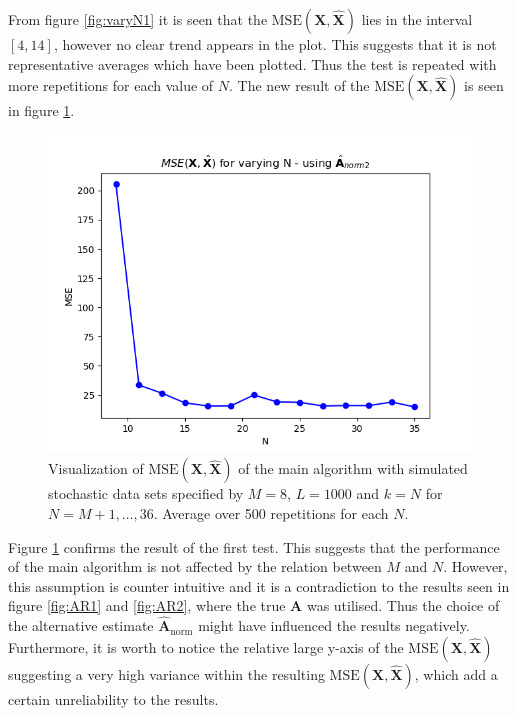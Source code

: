 \noindent
From figure \ref{fig:varyN1} it is seen that the $\text{MSE}(\mathbf{X}, \hat{\mathbf{X}})$ lies in the interval $[4,14]$, however no clear trend appears in the plot. 
This suggests that it is not representative averages which have been plotted. Thus the test is repeated with more repetitions for each value of $N$. The new result of the $\text{MSE}(\mathbf{X}, \hat{\mathbf{X}})$ is seen in figure \ref{fig:varyN2}.
\begin{figure}[H]
    \centering
	\includegraphics[scale=0.5]{figures/ch_6/varyN2.png}
	\caption{Visualization of $\text{MSE}(\mathbf{X}, \hat{\mathbf{X}})$ of the main algorithm with simulated stochastic data sets specified by $M = 8$, $L=1000$ and $k = N$ for $N = M+1, \hdots , 36$. Average over 500 repetitions for each $N$.}
	\label{fig:varyN2}
\end{figure}  
\noindent
Figure \ref{fig:varyN2} confirms the result of the first test. 
This suggests that the performance of the main algorithm is not affected by the relation between $M$ and $N$.
However, this assumption is counter intuitive and it is a contradiction to the results seen in figure \ref{fig:AR1} and \ref{fig:AR2}, where the true $\mathbf{A}$ was utilised. 
Thus the choice of the alternative estimate $\hat{\mathbf{A}}_{\text{norm}}$ might have influenced the results negatively. 
Furthermore, it is worth to notice the relative large y-axis of the $\text{MSE}(\mathbf{X}, \hat{\mathbf{X}})$ suggesting a very high variance within the resulting $\text{MSE}(\mathbf{X}, \hat{\mathbf{X}})$, which add a certain unreliability to the results.    